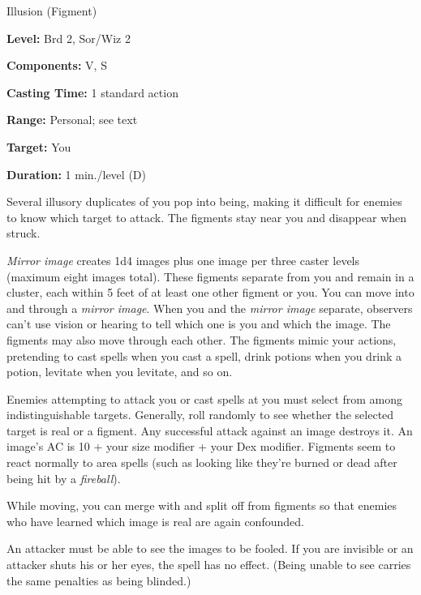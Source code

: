 
Illusion (Figment)

\textbf{Level:} Brd 2, Sor/Wiz 2

\textbf{Components:} V, S

\textbf{Casting Time:} 1 standard action

\textbf{Range:} Personal; see text

\textbf{Target:} You

\textbf{Duration:} 1 min./level (D)

Several illusory duplicates of you pop into being, making it difficult for enemies 
to know which target to attack. The figments stay near you and disappear when struck.

\textit{Mirror image} creates 1d4 images plus one image per three caster levels 
(maximum eight images total). These figments separate from you and remain in a 
cluster, each within 5 feet of at least one other figment or you. You can move 
into and through a \textit{mirror image}. When you and the \textit{mirror image 
}separate, observers can't use vision or hearing to tell which one is you and which 
the image. The figments may also move through each other. The figments mimic your 
actions, pretending to cast spells when you cast a spell, drink potions when you 
drink a potion, levitate when you levitate, and so on.

Enemies attempting to attack you or cast spells at you must select from among indistinguishable 
targets. Generally, roll randomly to see whether the selected target is real or 
a figment. Any successful attack against an image destroys it. An image's AC is 
10 + your size modifier + your Dex modifier. Figments seem to react normally to 
area spells (such as looking like they're burned or dead after being hit by a \textit{fireball}).

While moving, you can merge with and split off from figments so that enemies who 
have learned which image is real are again confounded.

An attacker must be able to see the images to be fooled. If you are invisible or 
an attacker shuts his or her eyes, the spell has no effect. (Being unable to see 
carries the same penalties as being blinded.)


